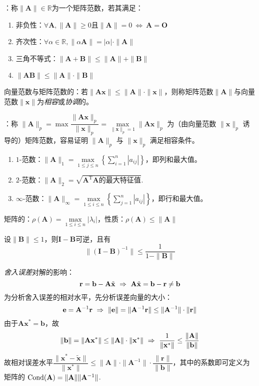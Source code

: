  {}：称$\|\mathbf{A}\|\in\mathbb{R}$为一个矩阵范数，若其满足：
\begin{enumerate}\tl
    \item 非负性：$\forall\mathbf{A},\|\mathbf{A}\|\geq0$且$\|\mathbf{A}\|=0\ \Leftrightarrow\ \mathbf{A=O}$
    \item 齐次性：$\forall\alpha\in\mathbb{R},\|\alpha\mathbf{A}\|=|\alpha|\cdot\|\mathbf{A}\|$
    \item 三角不等式：$\|\mathbf{A+B}\|\leq\|\mathbf{A}\|+\|\mathbf{B}\|$
    \item $\|\mathbf{AB}\|\leq\|\mathbf{A}\|\cdot\|\mathbf{B}\|$
\end{enumerate}

 向量范数与矩阵范数的：若$\|\mathbf{Ax}\|\leq\|\mathbf{A}\|\cdot\|\mathbf{x}\|$，则称矩阵范数$\|\mathbf{A}\|$与向量范数$\|\mathbf{x}\|$为\emph{相容}或\emph{协调}的。

\entry {}：称 $\|\mathbf{A}\|_p=\max\dfrac{\|\mathbf{Ax}\|_p}{\|\mathbf{x}\|_p}=\max\limits_{\|\mathbf{x}\|_p=1}\|\mathbf{Ax}\|_p$ 为（由向量范数 $\|\mathbf{x}\|_p$ 诱导的）矩阵范数，容易证明 $\|\mathbf{A}\|_p$ 与 $\|\mathbf{x}\|_p$ 满足相容条件。
\begin{enumerate}\tl
    \item $1$-范数：$\|\mathbf{A}\|_1=\max\limits_{1\leq j\leq n}\left\{\sum\limits_{i=1}^n|a_{ij}|\right\}$，即列和最大值。
    \item $2$-范数：$\|\mathbf{A}\|_2=\sqrt{\mathbf{A}^{\mathrm{T}}\mathbf{A}\text{的最大特征值}}$.
    \item $\infty$-范数：$\|\mathbf{A}\|_{\infty}=\max\limits_{1\leq i\leq n}\left\{\sum\limits_{j=1}^n|a_{ij}|\right\}$，即行和最大值。
\end{enumerate}

\entry 矩阵的：$\rho(\mathbf{A})=\max\limits_{1\leq i\leq n}|\lambda_i|$，性质：$\rho(\mathbf{A})\leq\|\mathbf{A}\|$

\trm\label{I-B} 设$\|\mathbf{B}\|\leq1$，则$\mathbf{I-B}$可逆，且有
\begin{equation}
\|(\mathbf{I-B})^{-1}\|\leq\frac1{1-\|\mathbf{B}\|}
\end{equation}

\entry \emph{舍入误差}对解的影响：
\[\mathbf{r=b-A}\tilde{\mathbf{x}}\ \Rightarrow\ \mathbf{A}\tilde{\mathbf{x}}=\mathbf{b-r}\neq\mathbf{b}\]
为分析舍入误差的相对水平，先分析误差向量的大小：
\[\mathbf{e}=\\\mathbf{A}^{-1}\mathbf{r}\ \Rightarrow\ \|\mathbf{e}\|=\|\mathbf{A}^{-1}\mathbf{r}\|\leq\|\mathbf{A}^{-1}\|\cdot\|\mathbf{r}\|\]
由于$\mathbf{Ax}^{\ast}=\mathbf{b}$，故
\[\|\mathbf{b}\|=\|\mathbf{Ax}^{\ast}\|\leq\|\mathbf{A}\|\cdot\|\mathbf{x}^{\ast}\|\ \Rightarrow\ \frac1{\|\mathbf{x}^{\ast}\|}\leq\frac{\|\mathbf{A}\|}{\|\mathbf{b}\|}\]
故相对误差水平$\dfrac{\|\mathbf{x}^{\ast}-\tilde{\mathbf{x}}\|}{\|\mathbf{x}^{\ast}\|}\leq\|\mathbf{A}\|\cdot\|\mathbf{A}^{-1}\|\cdot\dfrac{\|\mathbf{r}\|}{\|\mathbf{b}\|}$，其中的系数即可定义为矩阵的 $\operatorname{Cond}(\mathbf{A})=\|\mathbf{A}\|\|\mathbf{A}^{-1}\|$.

